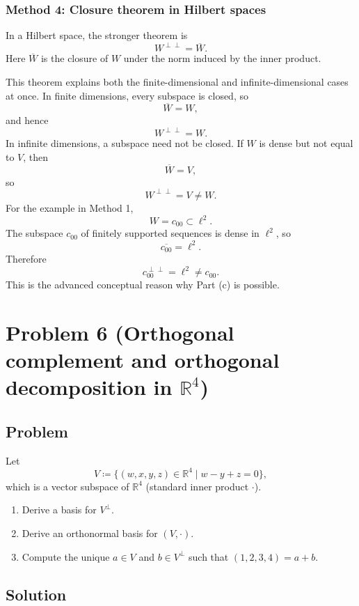 \documentclass[12pt]{article}
\newcommand{\df}{\coloneqq}
\newcommand{\R}{\mathbb{R}}
\begin{document}
\subsubsection{Method 4: Closure theorem in Hilbert spaces}
In a Hilbert space, the stronger theorem is
\[
\boxed{\,W^{\perp\perp}=\overline{W}.\,}
\]
Here $\overline{W}$ is the closure of $W$ under the norm induced by the inner product.

This theorem explains both the finite-dimensional and infinite-dimensional cases at once. In finite dimensions, every subspace is closed, so
\[
\overline{W}=W,
\]
and hence
\[
W^{\perp\perp}=W.
\]
In infinite dimensions, a subspace need not be closed. If $W$ is dense but not equal to $V$, then
\[
\overline{W}=V,
\]
so
\[
W^{\perp\perp}=V\ne W.
\]
For the example in Method 1,
\[
W=c_{00}\subset \ell^2.
\]
The subspace $c_{00}$ of finitely supported sequences is dense in $\ell^2$, so
\[
\overline{c_{00}}=\ell^2.
\]
Therefore
\[
c_{00}^{\perp\perp}=\ell^2\ne c_{00}.
\]
This is the advanced conceptual reason why Part (c) is possible.


\newpage
\section{Problem 6 (Orthogonal complement and orthogonal decomposition in $\R^4$)}
\subsection{Problem}
Let
\[
V\df \{(w,x,y,z)\in\R^4\mid w-y+z=0\},
\]
which is a vector subspace of $\R^4$ (standard inner product $\cdot$).
\begin{enumerate}[label=(\alph*)]
\item Derive a basis for $V^\perp$.
\item Derive an orthonormal basis for $(V,\cdot)$.
\item Compute the unique $a\in V$ and $b\in V^\perp$ such that $(1,2,3,4)=a+b$.
\end{enumerate}

\subsection{Solution}
\end{document}
